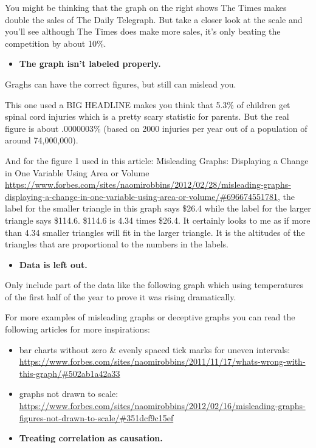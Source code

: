 \documentclass[]{book}
\providecommand{\tightlist}{%
  \setlength{\itemsep}{0pt}\setlength{\parskip}{0pt}}
\theoremstyle{definition}
\theoremstyle{definition}
\theoremstyle{definition}
\theoremstyle{remark}
\begin{document}
You might be thinking that the graph on the right shows The Times makes
double the sales of The Daily Telegraph. But take a closer look at the
scale and you'll see although The Times does make more sales, it's only
beating the competition by about 10\%.

\begin{itemize}
\tightlist
\item
  \textbf{The graph isn't labeled properly.}
\end{itemize}

Graghs can have the correct figures, but still can mislead you.

This one used a BIG HEADLINE makes you think that 5.3\% of children get
spinal cord injuries which is a pretty scary statistic for parents. But
the real figure is about .0000003\% (based on 2000 injuries per year out
of a population of around 74,000,000).

And for the figure 1 used in this article: Misleading Graphs: Displaying
a Change in One Variable Using Area or Volume
\url{https://www.forbes.com/sites/naomirobbins/2012/02/28/misleading-graphs-displaying-a-change-in-one-variable-using-area-or-volume/\#696674551781},
the label for the smaller triangle in this graph says \$26.4 while the
label for the larger triangle says \$114.6. \$114.6 is 4.34 times
\$26.4. It certainly looks to me as if more than 4.34 smaller triangles
will fit in the larger triangle. It is the altitudes of the triangles
that are proportional to the numbers in the labels.

\begin{itemize}
\tightlist
\item
  \textbf{Data is left out.}
\end{itemize}

Only include part of the data like the following graph which using
temperatures of the first half of the year to prove it was rising
dramatically.

For more examples of misleading graphs or deceptive graphs you can read
the following articles for more inspirations:

\begin{itemize}
\item
  bar charts without zero \& evenly spaced tick marks for uneven
  intervals:
  \url{https://www.forbes.com/sites/naomirobbins/2011/11/17/whats-wrong-with-this-graph/\#502ab1a42a33}
\item
  graphs not drawn to scale:
  \url{https://www.forbes.com/sites/naomirobbins/2012/02/16/misleading-graphs-figures-not-drawn-to-scale/\#351dcf9c15ef}
\item
  \textbf{Treating correlation as causation.}
\end{itemize}
\end{document}
